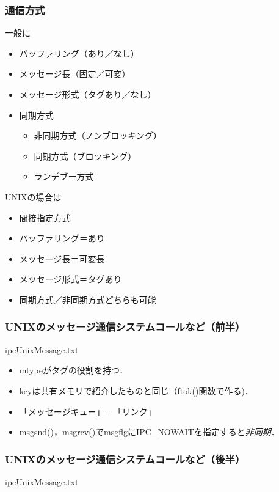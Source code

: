 \documentclass[unicode]{beamer}                   %
\begin{document}
\begin{frame}
  \frametitle{通信方式}
  一般に
  \begin{itemize}
  \item バッファリング（あり／なし）
  \item メッセージ長（固定／可変）
  \item メッセージ形式（タグあり／なし）
  \item 同期方式
    \begin{itemize}
    \item 非同期方式（ノンブロッキング）
    \item 同期方式（ブロッキング）
    \item ランデブー方式
    \end{itemize}
  \end{itemize}

  UNIXの場合は
  \begin{itemize}
  \item 間接指定方式
  \item バッファリング＝あり
  \item メッセージ長＝可変長
  \item メッセージ形式＝タグあり
  \item 同期方式／非同期方式どちらも可能
  \end{itemize}
\end{frame}

\begin{frame}
  \frametitle{UNIXのメッセージ通信システムコールなど（前半）}
      {ipcUnixMessage.txt}
  \begin{itemize}
  \item mtypeがタグの役割を持つ．
  \item keyは共有メモリで紹介したものと同じ（ftok()関数で作る)．
  \item 「メッセージキュー」＝「リンク」
  \item msgsnd()，msgrcv()でmsgflgにIPC\_NOWAITを指定すると\emph{非同期}．
  \end{itemize}
\end{frame}

\begin{frame}
  \frametitle{UNIXのメッセージ通信システムコールなど（後半）}
      {ipcUnixMessage.txt}
\end{frame}
\end{document}
